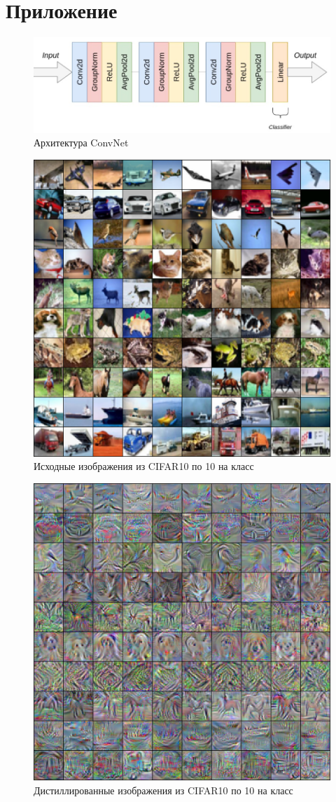 \documentclass[12pt]{article}
\begin{document}
\newpage



\newpage
\section{Приложение}

    \begin{figure}[h!]
            \centering
            \includegraphics[width=0.55\linewidth]
            {convnet_foto1.png}
            \caption{Архитектура ConvNet}
            \label{pril_convnet}
    \end{figure}

    \begin{figure}[h!]
            \centering
            \includegraphics[width=0.55\linewidth]
            {reconst_solo.png}
            \caption{Исходные изображения из CIFAR10 по 10 на класс}
            \label{pril_1}
    \end{figure}
    
    \begin{figure}[h!]
            \centering
            \includegraphics[width=0.55\linewidth]
            {dist_solo.png}
            \caption{Дистиллированные изображения из CIFAR10 по 10 на класс}
            \label{pril_2}
    \end{figure}
\end{document}

